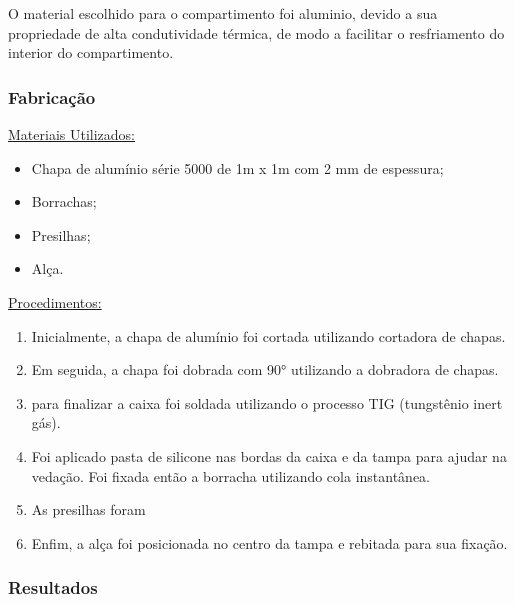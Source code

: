 O material escolhido para o compartimento foi aluminio, devido a sua propriedade de alta condutividade térmica, de modo a facilitar o resfriamento do interior do compartimento.

\subsubsection{Fabricação}

\underline{Materiais Utilizados:}

\begin{itemize}
	\item Chapa de alumínio série 5000 de 1m x 1m com 2 mm de espessura;
	\item Borrachas;
	\item Presilhas;
	\item Alça.
\end{itemize}

\underline{Procedimentos:}

\begin{enumerate}
	\item Inicialmente, a chapa de alumínio foi cortada utilizando cortadora de chapas.
	\item Em seguida, a chapa foi dobrada com 90° utilizando a dobradora de chapas.
	\item para finalizar a caixa foi soldada utilizando o processo TIG (tungstênio inert gás). 
	\item Foi aplicado pasta de silicone nas bordas da caixa e da tampa para ajudar na vedação. Foi fixada então a borracha utilizando cola instantânea.
	\item As presilhas foram
	\item Enfim, a alça foi posicionada no centro da tampa e rebitada para sua fixação.
\end{enumerate}

\subsubsection{Resultados}

